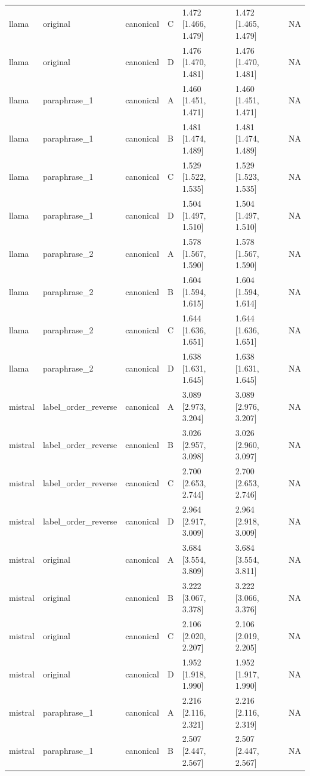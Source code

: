 \begin{tabular}{lllllll}
llama & original & canonical & C & 1.472 [1.466, 1.479] & 1.472 [1.465, 1.479] & NA \\
llama & original & canonical & D & 1.476 [1.470, 1.481] & 1.476 [1.470, 1.481] & NA \\
llama & paraphrase\_1 & canonical & A & 1.460 [1.451, 1.471] & 1.460 [1.451, 1.471] & NA \\
llama & paraphrase\_1 & canonical & B & 1.481 [1.474, 1.489] & 1.481 [1.474, 1.489] & NA \\
llama & paraphrase\_1 & canonical & C & 1.529 [1.522, 1.535] & 1.529 [1.523, 1.535] & NA \\
llama & paraphrase\_1 & canonical & D & 1.504 [1.497, 1.510] & 1.504 [1.497, 1.510] & NA \\
llama & paraphrase\_2 & canonical & A & 1.578 [1.567, 1.590] & 1.578 [1.567, 1.590] & NA \\
llama & paraphrase\_2 & canonical & B & 1.604 [1.594, 1.615] & 1.604 [1.594, 1.614] & NA \\
llama & paraphrase\_2 & canonical & C & 1.644 [1.636, 1.651] & 1.644 [1.636, 1.651] & NA \\
llama & paraphrase\_2 & canonical & D & 1.638 [1.631, 1.645] & 1.638 [1.631, 1.645] & NA \\
mistral & label\_order\_reverse & canonical & A & 3.089 [2.973, 3.204] & 3.089 [2.976, 3.207] & NA \\
mistral & label\_order\_reverse & canonical & B & 3.026 [2.957, 3.098] & 3.026 [2.960, 3.097] & NA \\
mistral & label\_order\_reverse & canonical & C & 2.700 [2.653, 2.744] & 2.700 [2.653, 2.746] & NA \\
mistral & label\_order\_reverse & canonical & D & 2.964 [2.917, 3.009] & 2.964 [2.918, 3.009] & NA \\
mistral & original & canonical & A & 3.684 [3.554, 3.809] & 3.684 [3.554, 3.811] & NA \\
mistral & original & canonical & B & 3.222 [3.067, 3.378] & 3.222 [3.066, 3.376] & NA \\
mistral & original & canonical & C & 2.106 [2.020, 2.207] & 2.106 [2.019, 2.205] & NA \\
mistral & original & canonical & D & 1.952 [1.918, 1.990] & 1.952 [1.917, 1.990] & NA \\
mistral & paraphrase\_1 & canonical & A & 2.216 [2.116, 2.321] & 2.216 [2.116, 2.319] & NA \\
mistral & paraphrase\_1 & canonical & B & 2.507 [2.447, 2.567] & 2.507 [2.447, 2.567] & NA \\

\end{tabular}
